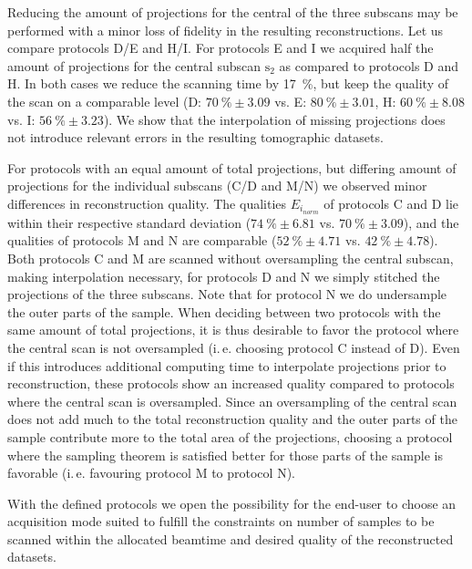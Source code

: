 Reducing the amount of projections for the central of the three subscans may be performed with a minor loss of fidelity in the resulting reconstructions. Let us compare protocols D/E and H/I. For protocols E and I we acquired half the amount of projections for the central subscan $\textrm{s}_{2}$ as compared to protocols D and H. In both cases we reduce the scanning time by \SI{17}{\percent}, but keep the quality of the scan on a comparable level (D: $\SI{70}{\percent}\pm3.09$ vs. E: $\SI{80}{\percent}\pm3.01$, H: $\SI{60}{\percent}\pm8.08$ vs. I: $\SI{56}{\percent}\pm3.23$).
We show that the interpolation of missing projections does not introduce relevant errors in the resulting tomographic datasets.

For protocols with an equal amount of total projections, but differing amount of projections for the individual subscans (C/D and M/N) we observed minor differences in reconstruction quality. The qualities $E_{i_{norm}}$ of protocols C and D lie within their respective standard deviation ($\SI{74}{\percent}\pm6.81$ vs. $\SI{70}{\percent}\pm3.09$), and the qualities of protocols M and N are comparable ($\SI{52}{\percent}\pm4.71$ vs. $\SI{42}{\percent}\pm4.78$). Both protocols C and M are scanned without oversampling the central subscan, making interpolation necessary, for protocols D and N we simply stitched the projections of the three subscans. Note that for protocol N we do undersample the outer parts of the sample. When deciding between two protocols with the same amount of total projections, it is thus desirable to favor the protocol where the central scan is not oversampled (i.\,e. choosing protocol C instead of D). Even if this introduces additional computing time to interpolate projections prior to reconstruction, these protocols show an increased quality compared to protocols where the central scan is oversampled. Since an oversampling of the central scan does not add much to the total reconstruction quality and the outer parts of the sample contribute more to the total area of the projections, choosing a protocol where the sampling theorem is satisfied better for those parts of the sample is favorable (i.\,e. favouring protocol M to protocol N).

With the defined protocols we open the possibility for the end-user to choose an acquisition mode suited to fulfill the constraints on number of samples to be scanned within the allocated beamtime and desired quality of the reconstructed datasets.

